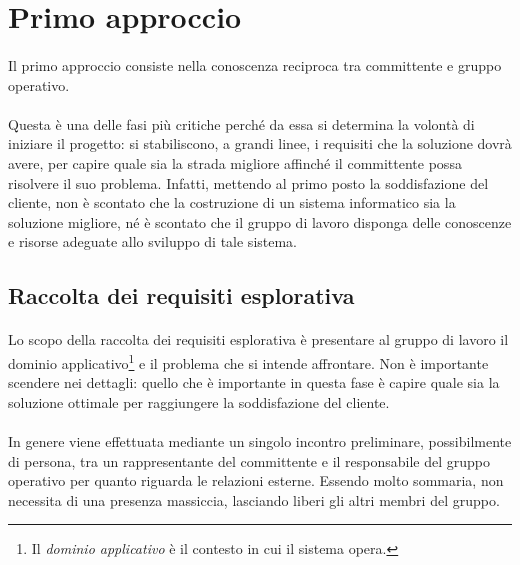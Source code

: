 \documentclass[11pt,a4paper,english]{article}
\begin{document}
\section{Primo approccio}

\paragraph{} Il primo approccio consiste nella conoscenza reciproca tra committente e gruppo operativo. 

\paragraph{} Questa è una delle fasi più critiche perché da essa si determina la volontà di iniziare il progetto: si stabiliscono, a grandi linee, i requisiti che la soluzione dovrà avere, per capire quale sia la strada migliore affinché il committente possa risolvere il suo problema. Infatti, mettendo al primo posto la soddisfazione del cliente, non è scontato che la costruzione di un sistema informatico sia la soluzione migliore, né è scontato che il gruppo di lavoro disponga delle conoscenze e risorse adeguate allo sviluppo di tale sistema. 


\subsection{Raccolta dei requisiti esplorativa}

\paragraph{} Lo scopo della raccolta dei requisiti esplorativa è presentare al gruppo di lavoro il dominio applicativo\footnote{Il \emph{dominio applicativo} è il contesto in cui il sistema opera.} e il problema che si intende affrontare. Non è importante scendere nei dettagli: quello che è importante in questa fase è capire quale sia la soluzione ottimale per raggiungere la soddisfazione del cliente. 

\paragraph{} In genere viene effettuata mediante un singolo incontro preliminare, possibilmente di persona, tra un rappresentante del committente e il responsabile del gruppo operativo per quanto riguarda le relazioni esterne. Essendo molto sommaria, non necessita di una presenza massiccia, lasciando liberi gli altri membri del gruppo. 
\end{document}
